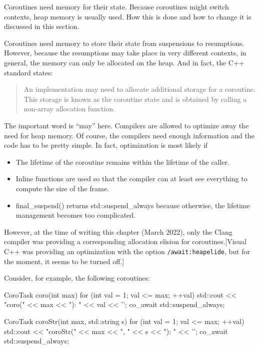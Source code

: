 

Coroutines need memory for their state. Because coroutines might switch contexts, heap memory is usually used. How this is done and how to change it is discussed in this section.



Coroutines need memory to store their state from suspensions to resumptions. However, because the resumptions may take place in very different contexts, in general, the memory can only be allocated on the heap. And in fact, the C++ standard states:

\begin{quote}
An implementation may need to allocate additional storage for a coroutine. This storage is known as the coroutine state and is obtained by calling a non-array allocation function.
\end{quote}

The important word is “may” here. Compilers are allowed to optimize away the need for heap memory. Of course, the compilers need enough information and the code has to be pretty simple. In fact, optimization is most likely if

\begin{itemize}
\item 
The lifetime of the coroutine remains within the lifetime of the caller.

\item 
Inline functions are used so that the compiler can at least see everything to compute the size of the frame.

\item 
final\_suspend() returns std::suspend\_always{} because otherwise, the lifetime management becomes too complicated.
\end{itemize}

However, at the time of writing this chapter (March 2022), only the Clang compiler was providing a corresponding allocation elision for coroutines.[Visual C++ was providing an optimization with the option \texttt{/await:heapelide}, but for the moment, it seems to be turned off.]

Consider, for example, the following coroutines:

\begin{cpp}
CoroTask coro(int max)
{
	for (int val = 1; val <= max; ++val) {
		std::cout << "coro(" << max << "): " << val << '\n';
		co_await std::suspend_always{};
	}
}

CoroTask coroStr(int max, std::string s)
{
	for (int val = 1; val <= max; ++val) {
		std::cout << "coroStr(" << max << ", " << s << "): " << '\n';
		co_await std::suspend_always{};
	}
}
\end{cpp}

